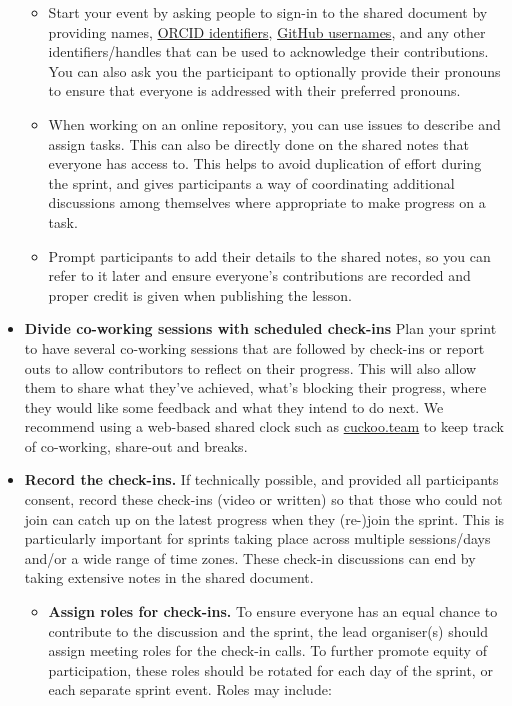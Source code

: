 \documentclass[
]{book}
\providecommand{\tightlist}{%
  \setlength{\itemsep}{0pt}\setlength{\parskip}{0pt}}
\begin{document}
\begin{itemize}
  \begin{itemize}
  \tightlist
  \item
    Start your event by asking people to sign-in to the shared document by providing names, \href{https://orcid.org/}{ORCID identifiers}, \href{https://github.com}{GitHub usernames}, and any other identifiers/handles that can be used to acknowledge their contributions.
    You can also ask you the participant to optionally provide their pronouns to ensure that everyone is addressed with their preferred pronouns.
  \item
    When working on an online repository, you can use issues to describe and assign tasks.
    This can also be directly done on the shared notes that everyone has access to.
    This helps to avoid duplication of effort during the sprint,
    and gives participants a way of coordinating additional discussions
    among themselves where appropriate to make progress on a task.
  \item
    Prompt participants to add their details to the shared notes,
    so you can refer to it later and ensure everyone's contributions are recorded and proper credit is
    given when publishing the lesson.
  \end{itemize}
\item
  \textbf{Divide co-working sessions with scheduled check-ins}
  Plan your sprint to have several co-working sessions that are followed by check-ins or report outs to allow contributors to reflect on their progress.
  This will also allow them to share what they've achieved, what's blocking their progress, where they would like some feedback and what they intend to do next.
  We recommend using a web-based shared clock such as \href{https://cuckoo.team/}{cuckoo.team} to keep track of co-working, share-out and breaks.
\item
  \textbf{Record the check-ins.}
  If technically possible, and provided all participants consent,
  record these check-ins (video or written) so that those who could not join can catch up
  on the latest progress when they (re-)join the sprint.
  This is particularly important for sprints taking place
  across multiple sessions/days and/or a wide range of time zones.
  These check-in discussions can end by taking extensive notes in the shared document.

  \begin{itemize}
  \tightlist
  \item
    \textbf{Assign roles for check-ins.}
    To ensure everyone has an equal chance to contribute to the discussion
    and the sprint,
    the lead organiser(s) should assign meeting roles for the check-in calls.
    To further promote equity of participation,
    these roles should be rotated for each day of the sprint,
    or each separate sprint event.
    Roles may include:


\end{itemize}
\end{itemize}
\end{document}
